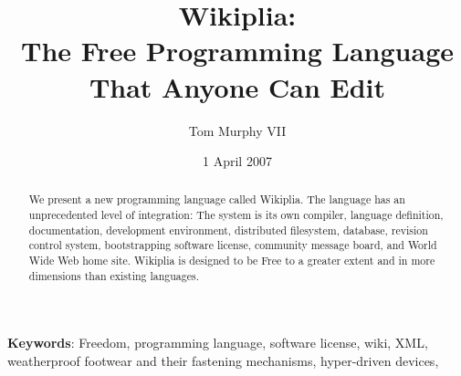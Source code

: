 \documentclass[twocolumn]{article}
\begin{document}
\newcommand\currentrevision{465}

\newcommand\ftinker{\ensuremath{\copyright}}
\newcommand\fexpression{\ensuremath{\hbar}}
\newcommand\fbeer{\ensuremath{\triangle}}
\newcommand\fusa{\ensuremath{\sqrt[x^{1.2}]{\mbox{\t{oo}} + \frac{x}{z^2}}}}
\newcommand\ffree{\ensuremath{\P}}
\newcommand\ftobe{{\tiny \ensuremath{\stackrel{\bigcirc}{\amalg}}}}

\newcommand\wcite[1]{\footnote{\tiny Wikipedia, the free encyclopedia: {\it #1}; 2007}}
\newcommand\comment[1]{}
\newcommand\z{\ensuremath{\!}}

\newcommand\D\Delta
\newcommand\G\Gamma
\newcommand\m\mapsto
\newcommand\eval{{\sf eval\,\,}}
\newcommand\tag[2]{{\tt{\mbox{\tt <}}{#1}{\mbox{\tt>}}}{#2}{\tt{\mbox{\tt</}}{#1}{\mbox{\tt>}}}}
\newcommand\prim{{\,\,\sf prim}}
\newcommand\rate{{\sf rate\,\,}}

\newcommand\lb{\ensuremath{[\![}}
\newcommand\rb{\ensuremath{]\!]}}

\title{{\bf \huge Wikiplia}:\\
       The Free Programming Language\\
       That Anyone Can Edit}

\author{Tom Murphy VII}
\date{1 April 2007}

\maketitle

\begin{abstract}
We present a new programming language called Wikiplia. The language
has an unprecedented level of integration: The system is its own
compiler, language definition, documentation, development environment,
distributed filesystem, database, revision control system,
bootstrapping software license, community message board, and World
Wide Web home site. Wikiplia is designed to be Free to a greater
extent and in more dimensions than existing languages.
\end{abstract}


\vspace{1em}
{\noindent \small {\bf Keywords}:
  Freedom, programming language, software license, wiki, XML, 
  weatherproof footwear and their fastening mechanisms,
  hyper-driven devices,
}
\end{document}
